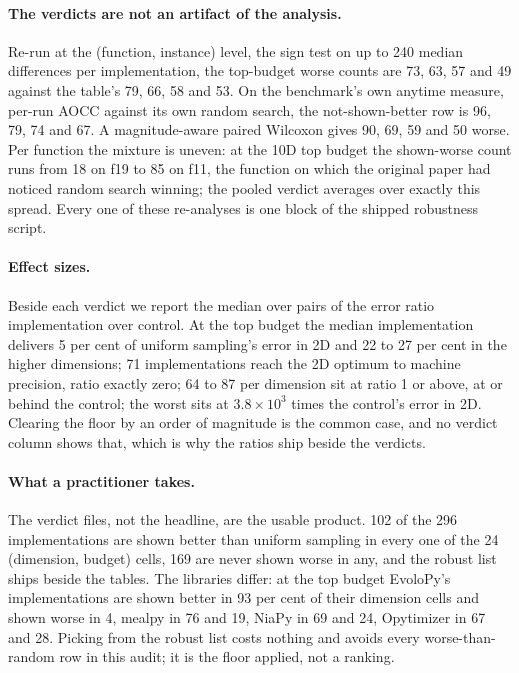 \documentclass[11pt]{article}
\begin{document}
\paragraph{The verdicts are not an artifact of the analysis.} Re-run at the (function,
instance) level, the sign test on up to 240 median differences per implementation, the
top-budget worse counts are 73, 63, 57 and 49 against the table's 79, 66, 58 and 53.
On the benchmark's own anytime measure, per-run AOCC against its own random search,
the not-shown-better row is 96, 79, 74 and 67. A magnitude-aware paired Wilcoxon gives
90, 69, 59 and 50 worse. Per function the mixture is uneven: at the 10D top budget the
shown-worse count runs from 18 on f19 to 85 on f11, the function on which the original
paper had noticed random search winning; the pooled verdict averages over exactly this
spread. Every one of these re-analyses is one block of the shipped robustness script.

\paragraph{Effect sizes.} Beside each verdict we report the median over pairs of the
error ratio implementation over control. At the top budget the median implementation
delivers 5 per cent of uniform sampling's error in 2D and 22 to 27 per cent in the
higher dimensions; 71 implementations reach the 2D optimum to machine precision, ratio
exactly zero; 64 to 87 per dimension sit at ratio 1 or above, at or behind the control;
the worst sits at $3.8 \times 10^3$ times the control's error in 2D. Clearing the
floor by an order of magnitude is the common case, and no verdict column shows that,
which is why the ratios ship beside the verdicts.

\paragraph{What a practitioner takes.} The verdict files, not the headline, are the
usable product. 102 of the 296 implementations are shown better than uniform sampling
in every one of the 24 (dimension, budget) cells, 169 are never shown worse in any,
and the robust list ships beside the tables. The libraries differ: at the top budget
EvoloPy's implementations are shown better in 93 per cent of their dimension cells and
shown worse in 4, mealpy in 76 and 19, NiaPy in 69 and 24, Opytimizer in 67 and 28.
Picking from the robust list costs nothing and avoids every worse-than-random row in
this audit; it is the floor applied, not a ranking.
\end{document}
